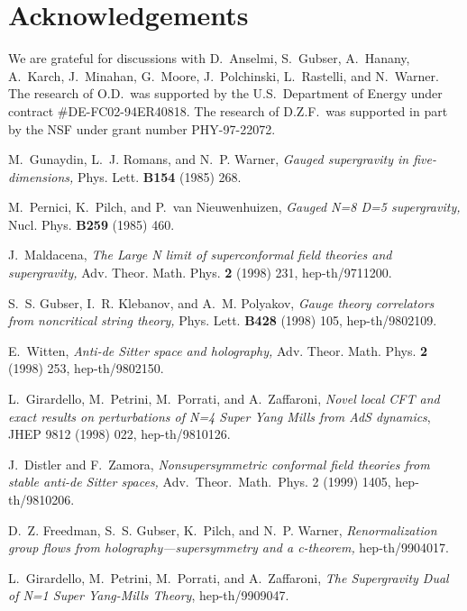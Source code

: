 \documentclass[a4paper,12pt]{article}
\begin{document}
\section*{Acknowledgements}

We are grateful for discussions with D.~Anselmi, S.~Gubser, A.~Hanany,
A.~Karch, J.~Minahan, G.~Moore, J.~Polchinski, L.~Rastelli, and
N.~Warner.  The research of O.D.\ was supported by the U.S.\
Department of Energy under contract \#DE-FC02-94ER40818.  The research
of D.Z.F.\ was supported in part by the NSF under grant number
PHY-97-22072.


\begin{thebibliography}{99}


 M.~Gunaydin, L.~J. Romans, and N.~P. Warner, {\em
Gauged \coordHE{} supergravity in five-dimensions,} Phys. Lett.
{\bf B154} (1985) 268.

M.~Pernici, K.~Pilch, and P.~van Nieuwenhuizen, {\em Gauged N=8 D=5
  supergravity,}  Nucl. Phys. {\bf B259} (1985) 460.


J.~Maldacena, {\em The Large N limit of superconformal field theories and
  supergravity,} Adv. Theor. Math. Phys. {\bf 2} (1998) 231,
   hep-th/9711200.

 S.~S. Gubser, I.~R. Klebanov, and A.~M. Polyakov, {\em
Gauge theory correlators from noncritical string theory,}
Phys. Lett. {\bf B428} (1998) 105, hep-th/9802109.

E.~Witten, {\em Anti-de Sitter space and holography,} Adv. Theor. Math.
  Phys. {\bf 2} (1998) 253, hep-th/9802150.

 L.~Girardello, M.~Petrini, M.~Porrati, and
A.~Zaffaroni, {\em Novel local CFT and exact results on perturbations
of N=4 Super Yang Mills from AdS dynamics}, JHEP 9812 (1998) 022,
hep-th/9810126.

 J.~Distler and F.~Zamora, {\em Nonsupersymmetric
conformal field theories from stable anti-de Sitter spaces,}
Adv.~Theor.~Math.~Phys. 2 (1999) 1405, hep-th/9810206.

 D.~Z. Freedman, S.~S. Gubser, K.~Pilch, and
N.~P. Warner, {\em Renormalization group flows from
holography---supersymmetry and a c-theorem,} hep-th/9904017.

 L.~Girardello, M.~Petrini, M.~Porrati, and
A.~Zaffaroni, {\em The Supergravity Dual of N=1 Super Yang-Mills
Theory}, hep-th/9909047.



\end{thebibliography}
\end{document}
